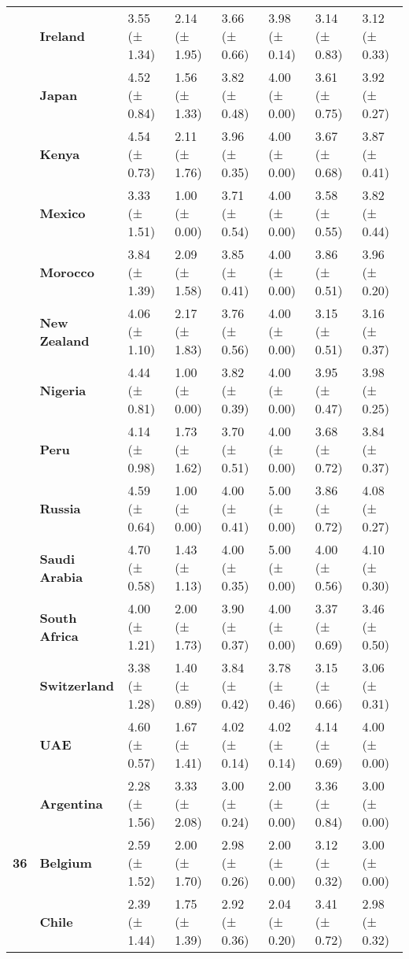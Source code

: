 \begin{longtable}{llllllll}
\textbf{} & \textbf{Ireland} & 3.55 (± 1.34) & 2.14 (± 1.95) & 3.66 (± 0.66) & 3.98 (± 0.14) & 3.14 (± 0.83) & 3.12 (± 0.33) \\
\textbf{} & \textbf{Japan} & 4.52 (± 0.84) & 1.56 (± 1.33) & 3.82 (± 0.48) & 4.00 (± 0.00) & 3.61 (± 0.75) & 3.92 (± 0.27) \\
\textbf{} & \textbf{Kenya} & 4.54 (± 0.73) & 2.11 (± 1.76) & 3.96 (± 0.35) & 4.00 (± 0.00) & 3.67 (± 0.68) & 3.87 (± 0.41) \\
\textbf{} & \textbf{Mexico} & 3.33 (± 1.51) & 1.00 (± 0.00) & 3.71 (± 0.54) & 4.00 (± 0.00) & 3.58 (± 0.55) & 3.82 (± 0.44) \\
\textbf{} & \textbf{Morocco} & 3.84 (± 1.39) & 2.09 (± 1.58) & 3.85 (± 0.41) & 4.00 (± 0.00) & 3.86 (± 0.51) & 3.96 (± 0.20) \\
\textbf{} & \textbf{New Zealand} & 4.06 (± 1.10) & 2.17 (± 1.83) & 3.76 (± 0.56) & 4.00 (± 0.00) & 3.15 (± 0.51) & 3.16 (± 0.37) \\
\textbf{} & \textbf{Nigeria} & 4.44 (± 0.81) & 1.00 (± 0.00) & 3.82 (± 0.39) & 4.00 (± 0.00) & 3.95 (± 0.47) & 3.98 (± 0.25) \\
\textbf{} & \textbf{Peru} & 4.14 (± 0.98) & 1.73 (± 1.62) & 3.70 (± 0.51) & 4.00 (± 0.00) & 3.68 (± 0.72) & 3.84 (± 0.37) \\
\textbf{} & \textbf{Russia} & 4.59 (± 0.64) & 1.00 (± 0.00) & 4.00 (± 0.41) & 5.00 (± 0.00) & 3.86 (± 0.72) & 4.08 (± 0.27) \\
\textbf{} & \textbf{Saudi Arabia} & 4.70 (± 0.58) & 1.43 (± 1.13) & 4.00 (± 0.35) & 5.00 (± 0.00) & 4.00 (± 0.56) & 4.10 (± 0.30) \\
\textbf{} & \textbf{South Africa} & 4.00 (± 1.21) & 2.00 (± 1.73) & 3.90 (± 0.37) & 4.00 (± 0.00) & 3.37 (± 0.69) & 3.46 (± 0.50) \\
\textbf{} & \textbf{Switzerland} & 3.38 (± 1.28) & 1.40 (± 0.89) & 3.84 (± 0.42) & 3.78 (± 0.46) & 3.15 (± 0.66) & 3.06 (± 0.31) \\
\textbf{} & \textbf{UAE} & 4.60 (± 0.57) & 1.67 (± 1.41) & 4.02 (± 0.14) & 4.02 (± 0.14) & 4.14 (± 0.69) & 4.00 (± 0.00) \\
\cline{1-8}
\multirow[t]{19}{*}{\textbf{36}} & \textbf{Argentina} & 2.28 (± 1.56) & 3.33 (± 2.08) & 3.00 (± 0.24) & 2.00 (± 0.00) & 3.36 (± 0.84) & 3.00 (± 0.00) \\
\textbf{} & \textbf{Belgium} & 2.59 (± 1.52) & 2.00 (± 1.70) & 2.98 (± 0.26) & 2.00 (± 0.00) & 3.12 (± 0.32) & 3.00 (± 0.00) \\
\textbf{} & \textbf{Chile} & 2.39 (± 1.44) & 1.75 (± 1.39) & 2.92 (± 0.36) & 2.04 (± 0.20) & 3.41 (± 0.72) & 2.98 (± 0.32) \\

\end{longtable}
